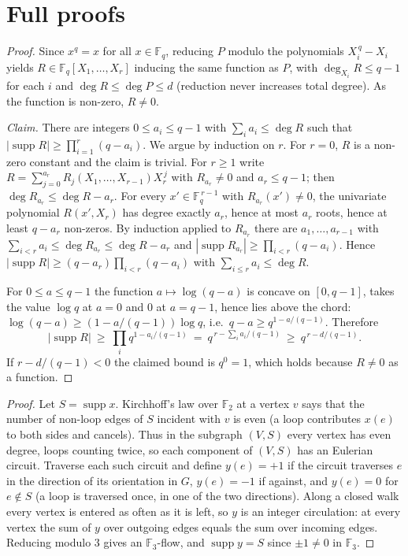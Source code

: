 \documentclass[11pt,a4paper]{article}
\theoremstyle{plain}
\theoremstyle{definition}
\theoremstyle{remark}
\newcommand{\F}{{\mathbb F}}
\DeclareMathOperator{\supp}{supp}
\begin{document}
\appendix

\section{Full proofs}\label{app:proofs}

\label{pf:AF}
\lemAF*
\begin{proof}
Since $x^{q}=x$ for all $x\in\F_q$, reducing $P$ modulo the polynomials $X_i^{\,q}-X_i$ yields $R\in\F_q[X_1,\dots,X_r]$ inducing the same function as $P$, with $\deg_{X_i}R\le q-1$ for each $i$ and $\deg R\le\deg P\le d$ (reduction never increases total degree). As the function is non-zero, $R\ne0$.

\emph{Claim.} There are integers $0\le a_i\le q-1$ with $\sum_ia_i\le\deg R$ such that $|\supp R|\ge\prod_{i=1}^r(q-a_i)$. We argue by induction on $r$. For $r=0$, $R$ is a non-zero constant and the claim is trivial. For $r\ge1$ write $R=\sum_{j=0}^{a_r}R_j(X_1,\dots,X_{r-1})X_r^{\,j}$ with $R_{a_r}\ne0$ and $a_r\le q-1$; then $\deg R_{a_r}\le\deg R-a_r$. For every $x'\in\F_q^{\,r-1}$ with $R_{a_r}(x')\ne0$, the univariate polynomial $R(x',X_r)$ has degree exactly $a_r$, hence at most $a_r$ roots, hence at least $q-a_r$ non-zeros. By induction applied to $R_{a_r}$ there are $a_1,\dots,a_{r-1}$ with $\sum_{i<r}a_i\le\deg R_{a_r}\le\deg R-a_r$ and $|\supp R_{a_r}|\ge\prod_{i<r}(q-a_i)$. Hence $|\supp R|\ge(q-a_r)\prod_{i<r}(q-a_i)$ with $\sum_{i\le r}a_i\le\deg R$.

For $0\le a\le q-1$ the function $a\mapsto\log(q-a)$ is concave on $[0,q-1]$, takes the value $\log q$ at $a=0$ and $0$ at $a=q-1$, hence lies above the chord: $\log(q-a)\ge(1-a/(q-1))\log q$, i.e.\ $q-a\ge q^{1-a/(q-1)}$. Therefore
\[
 |\supp R|\ \ge\ \prod_{i}q^{1-a_i/(q-1)}\ =\ q^{\,r-\sum_ia_i/(q-1)}\ \ge\ q^{\,r-d/(q-1)}.
\]
If $r-d/(q-1)<0$ the claimed bound is $q^0=1$, which holds because $R\ne0$ as a function.
\end{proof}

\label{pf:lift}
\lemlift*
\begin{proof}
Let $S=\supp x$. Kirchhoff's law over $\F_2$ at a vertex $v$ says that the number of non-loop edges of $S$ incident with $v$ is even (a loop contributes $x(e)$ to both sides and cancels). Thus in the subgraph $(V,S)$ every vertex has even degree, loops counting twice, so each component of $(V,S)$ has an Eulerian circuit. Traverse each such circuit and define $y(e)=+1$ if the circuit traverses $e$ in the direction of its orientation in $G$, $y(e)=-1$ if against, and $y(e)=0$ for $e\notin S$ (a loop is traversed once, in one of the two directions). Along a closed walk every vertex is entered as often as it is left, so $y$ is an integer circulation: at every vertex the sum of $y$ over outgoing edges equals the sum over incoming edges. Reducing modulo $3$ gives an $\F_3$-flow, and $\supp y=S$ since $\pm1\ne0$ in $\F_3$.
\end{proof}
\end{document}

